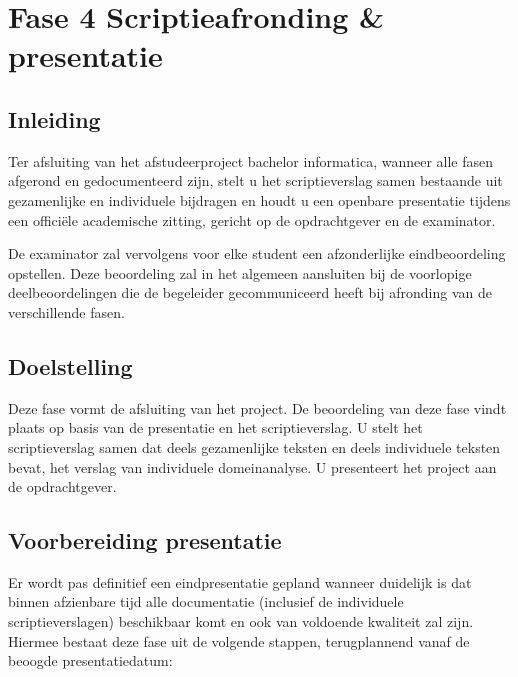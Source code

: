 \section{Fase 4 Scriptieafronding \& presentatie}

\subsection{Inleiding}
Ter afsluiting van het afstudeerproject bachelor
informatica, wanneer alle fasen afgerond en gedocumenteerd
zijn, stelt u het scriptieverslag samen bestaande uit
gezamenlijke en individuele bijdragen en houdt u een openbare
presentatie tijdens een offici\"ele academische zitting, gericht
op de opdrachtgever en de examinator.

De examinator zal vervolgens voor elke student een
afzonderlijke eindbeoordeling opstellen. Deze beoordeling zal
in het algemeen aansluiten bij de voorlopige deelbeoordelingen
die de begeleider gecommuniceerd heeft bij afronding van de
verschillende fasen.


\subsection{Doelstelling}
Deze fase vormt de afsluiting van het project. De beoordeling van deze fase
vindt plaats op basis van de presentatie en het scriptieverslag.
U stelt het scriptieverslag samen dat deels gezamenlijke teksten en deels
individuele teksten bevat, het verslag van individuele domeinanalyse.
U presenteert het project aan de opdrachtgever.

\subsection{Voorbereiding presentatie}
Er wordt pas definitief een eindpresentatie gepland wanneer duidelijk is dat
binnen afzienbare tijd alle documentatie (inclusief de individuele
scriptieverslagen) beschikbaar komt en ook van voldoende kwaliteit zal zijn.
Hiermee bestaat deze fase uit de volgende stappen, terugplannend vanaf de
beoogde presentatiedatum:

